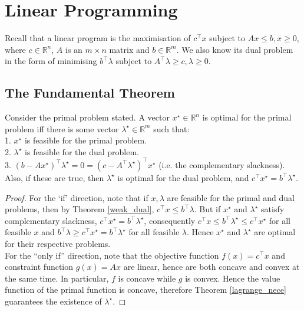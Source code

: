 \section{Linear Programming}
Recall that a linear program is the maximisation of $c^\top x$ subject to $Ax\le b,x\ge 0$, where $c\in\mathbb R^n$, $A$ is an $m\times n$ matrix and $b\in\mathbb R^m$.
We also know its dual problem in the form of minimising $b^\top\lambda$ subject to $A^\top\lambda\ge c,\lambda\ge 0$.
\subsection{The Fundamental Theorem}
\begin{theorem}
    Consider the primal problem stated.
    A vector $x^\star\in\mathbb R^n$ is optimal for the primal problem iff there is some vector $\lambda^\star\in\mathbb R^m$ such that:\\
    1. $x^\star$ is feasible for the primal problem.\\
    2. $\lambda^\star$ is feasible for the dual problem.\\
    3. $(b-Ax^\star)^\top\lambda^\star=0=(c-A^\top\lambda^\star)^\top x^\star$ (i.e. the complementary slackness).\\
    Also, if these are true, then $\lambda^\star$ is optimal for the dual problem, and $c^\top x^\star=b^\top\lambda^\star$.
\end{theorem}
\begin{proof}
    For the `if' direction, note that if $x,\lambda$ are feasible for the primal and dual problems, then by Theorem \ref{weak_dual}, $c^\top x\le b^\top\lambda$.
    But if $x^\star$ and $\lambda^\star$ satisfy complementary slackness, $c^\top x^\star=b^\top\lambda^\star$, consequently $c^\top x\le b^\top\lambda^\star\le c^\top x^\star$ for all feasible $x$ and $b^\top\lambda\ge c^\top x^\star=b^\top\lambda^\star$ for all feasible $\lambda$.
    Hence $x^\star$ and $\lambda^\star$ are optimal for their respective problems.\\
    For the ``only if'' direction, note that the objective function $f(x)=c^\top x$ and constraint function $g(x)=Ax$ are linear, hence are both concave and convex at the same time.
    In particular, $f$ is concave while $g$ is convex.
    Hence the value function of the primal function is concave, therefore Theorem \ref{lagrange_nece} guarantees the existence of $\lambda^\star$.
\end{proof}
